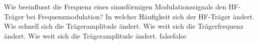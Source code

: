     {Wie beeinflusst die Frequenz eines sinusförmigen Modulationssignals den HF-Träger bei Frequenzmodulation?}
    {In welcher Häufigkeit sich der HF-Träger ändert.
}
    {Wie schnell sich die Trägeramplitude ändert.}
    {Wie weit sich die Trägerfrequenz ändert.}
    {Wie weit sich die Trägeramplitude ändert.}
    {false}{false}